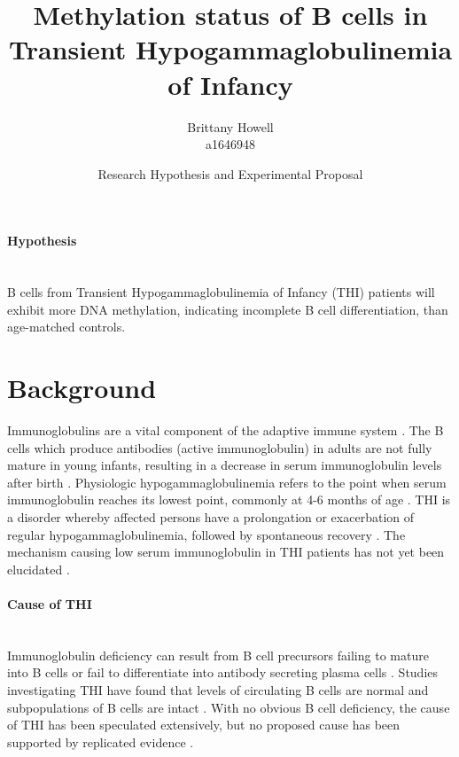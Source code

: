 \documentclass[12pt]{article}
\title{Methylation status of B cells in Transient Hypogammaglobulinemia of Infancy}
\date{Research Hypothesis and Experimental Proposal}
\author{Brittany Howell \\ a1646948}
\begin{document}
	\maketitle
	
	\paragraph{Hypothesis}
	~\\
	B cells from Transient Hypogammaglobulinemia of Infancy (THI) patients will exhibit more DNA methylation, indicating incomplete B cell differentiation, than age-matched controls.
	
	\section{Background}
	
		Immunoglobulins are a vital component of the adaptive immune system \citep{Simon15}.  
		The B cells which produce antibodies (active immunoglobulin) in adults are not fully mature in young infants, resulting in a decrease in serum immunoglobulin levels after birth \citep{Martin10,Rechavi15,Stiemh80}. 
		Physiologic hypogammaglobulinemia refers to the point when serum immunoglobulin reaches its lowest point, commonly at 4-6 months of age \citep{Dressler89}. 
		THI is a disorder whereby affected persons have a prolongation or exacerbation of regular hypogammaglobulinemia, followed by spontaneous recovery \citep{Stiemh80,Dressler89,AlHerz14,Gitlin56,AlHerz11,Rosen66,McGeady87, Dalal98,Tiller78,Buckley83}.
		The mechanism causing low serum immunoglobulin in THI patients has not yet been elucidated \citep{AlHerz14}. 

	\newpage 
	
		\paragraph{Cause of THI} 
			~\\
			Immunoglobulin deficiency can result from B cell precursors failing to mature into B cells or  fail to differentiate into antibody secreting plasma cells \citep{Fiorilli86}. 
			Studies investigating THI have found that levels of circulating B cells are normal and subpopulations of B cells are intact \citep{Tiller78,Stiemh80,Siegel81,Buckley83,Fiorilli86,Dressler89}.
			With no obvious B cell deficiency, the cause of THI has been speculated extensively, but no proposed cause has been supported by replicated evidence \citep{Fudenberg64,Rosen66,Nathenson71,Willenbockel60,Soothill68,Tiller78,Fiorilli86,Ovadia14,Siegel81,McGeady87}.
			
\end{document}
